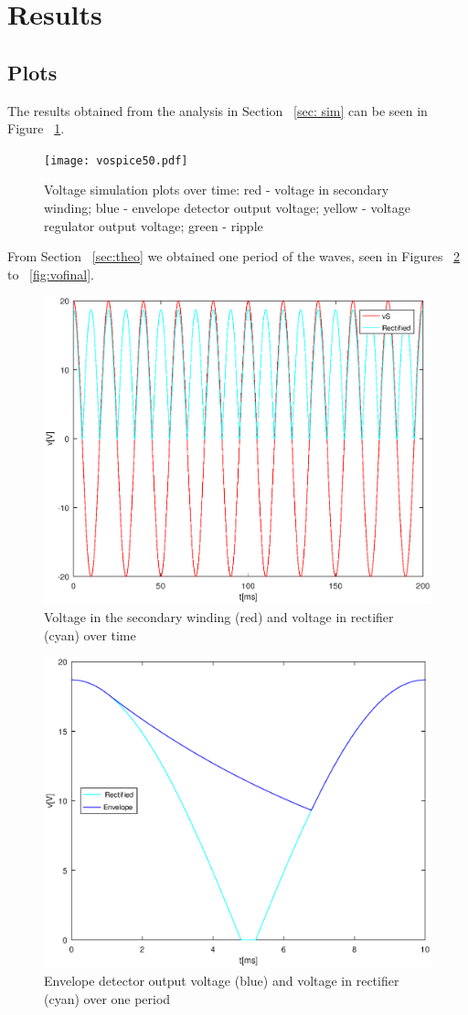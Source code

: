\section{Results}
\label{sec: res}

\subsection{Plots}
The results obtained from the analysis in Section ~\ref{sec: sim} can be seen in Figure ~\ref{fig:rc1}.
\begin{figure}[H] \centering
  \texttt{[image: vospice50.pdf]}
\caption{Voltage simulation plots over time: red - voltage in secondary winding; blue - envelope detector output voltage; yellow - voltage regulator output voltage; green - ripple}
\label{fig:rc1}
\end{figure}

From Section ~\ref{sec:theo} we obtained one period of the waves, seen in Figures ~\ref{fig:vo} to ~\ref{fig:vofinal}. 

\begin{figure}[H] \centering
\includegraphics[width=0.4\linewidth]{vo.eps}
\caption{Voltage in the secondary winding (red) and voltage in rectifier (cyan) over time}
\label{fig:vo}
\end{figure}

\begin{figure}[H] \centering
\includegraphics[width=0.4\linewidth]{venvlope.eps}
\caption{Envelope detector output voltage (blue) and voltage in rectifier (cyan) over one period}
\label{fig:voen}
\end{figure}

